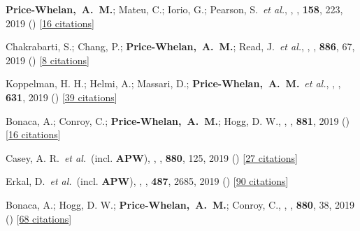 \item[{\color{deemph}\scriptsize56}]\textbf{Price-Whelan,~A.~M.}; Mateu, C.; Iorio, G.; Pearson, S.~\textit{et al.}, , \aj, \textbf{158}, 223, 2019 () [\href{http://adsabs.harvard.edu/abs/2019AJ....158..223P}{16 citations}]

\item[{\color{deemph}\scriptsize55}]Chakrabarti, S.; Chang, P.; \textbf{Price-Whelan,~A.~M.}; Read, J.~\textit{et al.}, , \apj, \textbf{886}, 67, 2019 () [\href{http://adsabs.harvard.edu/abs/2019ApJ...886...67C}{8 citations}]

\item[{\color{deemph}\scriptsize54}]Koppelman, H. H.; Helmi, A.; Massari, D.; \textbf{Price-Whelan,~A.~M.}~\textit{et al.}, , \aanda, \textbf{631}, 2019 () [\href{http://adsabs.harvard.edu/abs/2019A&A...631L...9K}{39 citations}]

\item[{\color{deemph}\scriptsize53}]Bonaca, A.; Conroy, C.; \textbf{Price-Whelan,~A.~M.}; Hogg, D. W., , \apj, \textbf{881}, 2019 () [\href{http://adsabs.harvard.edu/abs/2019ApJ...881L..37B}{16 citations}]

\item[{\color{deemph}\scriptsize52}]Casey, A. R.~\textit{et al.}~(incl. \textbf{APW}), , \apj, \textbf{880}, 125, 2019 () [\href{http://adsabs.harvard.edu/abs/2019ApJ...880..125C}{27 citations}]

\item[{\color{deemph}\scriptsize51}]Erkal, D.~\textit{et al.}~(incl. \textbf{APW}), , \mnras, \textbf{487}, 2685, 2019 () [\href{http://adsabs.harvard.edu/abs/2019MNRAS.487.2685E}{90 citations}]

\item[{\color{deemph}\scriptsize50}]Bonaca, A.; Hogg, D. W.; \textbf{Price-Whelan,~A.~M.}; Conroy, C., , \apj, \textbf{880}, 38, 2019 () [\href{http://adsabs.harvard.edu/abs/2019ApJ...880...38B}{68 citations}]

